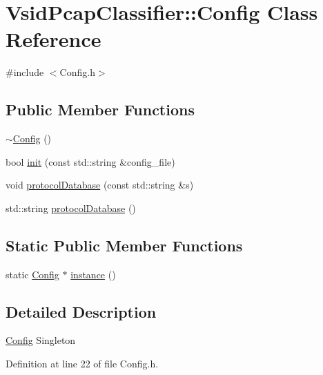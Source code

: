 \hypertarget{class_vsid_pcap_classifier_1_1_config}{\section{Vsid\-Pcap\-Classifier\-:\-:Config Class Reference}
\label{class_vsid_pcap_classifier_1_1_config}
}


{\ttfamily \#include $<$Config.\-h$>$}

\subsection*{Public Member Functions}
\begin{DoxyCompactItemize}
\item 
\hyperlink{class_vsid_pcap_classifier_1_1_config_a6c22f9b95b0d31fbb26a3b59c8bbf60a}{$\sim$\-Config} ()
\item 
bool \hyperlink{class_vsid_pcap_classifier_1_1_config_a5b1bc7b9f71d230ff93e24295c2bcfb5}{init} (const std\-::string \&config\-\_\-file)
\item 
void \hyperlink{class_vsid_pcap_classifier_1_1_config_a31982ebd9df40871ceda598bf6c1ca52}{protocol\-Database} (const std\-::string \&s)
\item 
std\-::string \hyperlink{class_vsid_pcap_classifier_1_1_config_ab2a3c53b5fb2870964e40bfe1bd2055a}{protocol\-Database} ()
\end{DoxyCompactItemize}
\subsection*{Static Public Member Functions}
\begin{DoxyCompactItemize}
\item 
static \hyperlink{class_vsid_pcap_classifier_1_1_config}{Config} $\ast$ \hyperlink{class_vsid_pcap_classifier_1_1_config_abf1d4539011ef83cac0fef2ac864a3a9}{instance} ()
\end{DoxyCompactItemize}


\subsection{Detailed Description}
\hyperlink{class_vsid_pcap_classifier_1_1_config}{Config} Singleton 

Definition at line 22 of file Config.\-h.



